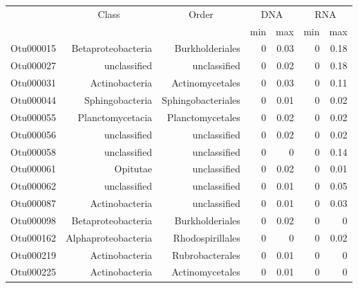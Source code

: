 \begin{table}[ht]
\centering
\begin{tabular}{crrrrrr}
  \hline
  & \multicolumn{1}{c}{Class} & \multicolumn{1}{c}{Order} & 
                      \multicolumn{2}{c}{DNA} & \multicolumn{2}{c}{RNA} \\
 & &  & min & max & min & max \\
 \hline
Otu000015 & Betaproteobacteria & Burkholderiales & 0 & 0.03 & 0 & 0.18 \\ 
  Otu000027 & unclassified & unclassified & 0 & 0.02 & 0 & 0.18 \\ 
  Otu000031 & Actinobacteria & Actinomycetales & 0 & 0.03 & 0 & 0.11 \\ 
  Otu000044 & Sphingobacteria & Sphingobacteriales & 0 & 0.01 & 0 & 0.02 \\ 
  Otu000055 & Planctomycetacia & Planctomycetales & 0 & 0.02 & 0 & 0.02 \\ 
  Otu000056 & unclassified & unclassified & 0 & 0.02 & 0 & 0.02 \\ 
  Otu000058 & unclassified & unclassified & 0 & 0 & 0 & 0.14 \\ 
  Otu000061 & Opitutae & unclassified & 0 & 0.02 & 0 & 0.01 \\ 
  Otu000062 & unclassified & unclassified & 0 & 0.01 & 0 & 0.05 \\ 
  Otu000087 & Actinobacteria & unclassified & 0 & 0.01 & 0 & 0.03 \\ 
  Otu000098 & Betaproteobacteria & Burkholderiales & 0 & 0.02 & 0 & 0 \\ 
  Otu000162 & Alphaproteobacteria & Rhodospirillales & 0 & 0 & 0 & 0.02 \\ 
  Otu000219 & Actinobacteria & Rubrobacterales & 0 & 0.01 & 0 & 0 \\ 
  Otu000225 & Actinobacteria & Actinomycetales & 0 & 0.01 & 0 & 0 \\ 
   \hline
\end{tabular}
\end{table}

